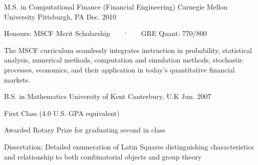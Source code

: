 \begin{cventries}
  \cventry
    {M.S. in Computational Finance (Financial Engineering)}
    {Carnegie Mellon University}
    {Pittsburgh, PA}
    {Dec. 2010}
    {
      \begin{cvitems}
        \item {Honours: MSCF Merit Scholarship ~~~·~~~ GRE Quant: 770/800}
        \item {The MSCF curriculum seamlessly integrates instruction in probability, statistical analysis, numerical methods, computation and simulation methods, stochastic processes, economics, and their application in today’s quantitative financial markets.}
      \end{cvitems}
    }  
  \cventry
    {B.S. in Mathematics}
    {University of Kent}
    {Canterbury, U.K}
    {Jun. 2007}
    {
      \begin{cvitems}
        \item {First Class (4.0 U.S. GPA equivalent)} 
        \item {Awarded Rotary Prize for graduating second in class}
        \item {Dissertation: Detailed enumeration of Latin Squares distinguishing characteristics and relationship to both combinatorial objects and group theory}
      \end{cvitems}
    }
\end{cventries}
